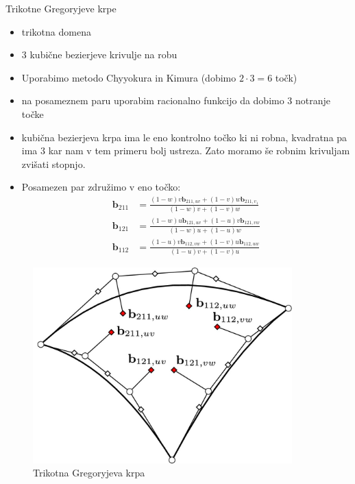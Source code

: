\documentclass[a4paper,8pt]{beamer}
\newcommand{\tbf}{\textbf}
\begin{document}
\begin{frame}{Trikotne Gregoryjeve krpe}
	\begin{itemize}
		\item trikotna domena
		\item 3 kubične bezierjeve krivulje na robu
		\item Uporabimo metodo Chyyokura in Kimura (dobimo $2 \cdot 3 = 6$ točk)
		\item na posameznem paru uporabim racionalno funkcijo da dobimo 3 notranje točke
		\item kubična bezierjeva krpa ima le eno kontrolno točko ki ni robna, kvadratna pa ima 3 kar nam v tem primeru bolj ustreza. Zato moramo še robnim krivuljam zvišati stopnjo.
		\item Posamezen par združimo v eno točko:
		\begin{align*}
		\tbf{b}_{211} &= \frac{(1-w)v \tbf{b}_{211,uv}+(1-v)w\tbf{b}_{211,v_1}}{(1-w)v+(1-v)w} \\
		\tbf{b}_{121} &= \frac{(1-w)u \tbf{b}_{121,uv}+(1-u)v\tbf{b}_{121,vw}}{(1-w)u+(1-u)w} \\
		\tbf{b}_{112} &= \frac{(1-u)v \tbf{b}_{112,vw}+(1-v)u\tbf{b}_{112,uw}}{(1-u)v+(1-v)u} 
		\end{align*}
	\end{itemize}
\end{frame}
\begin{frame}
	\begin{figure}[h]
		\centering
		\includegraphics[width=10cm]{gregory_krpe_trikotna.jpg}
		\caption{Trikotna Gregoryjeva krpa}
	\end{figure}
\end{frame}
\end{document}
